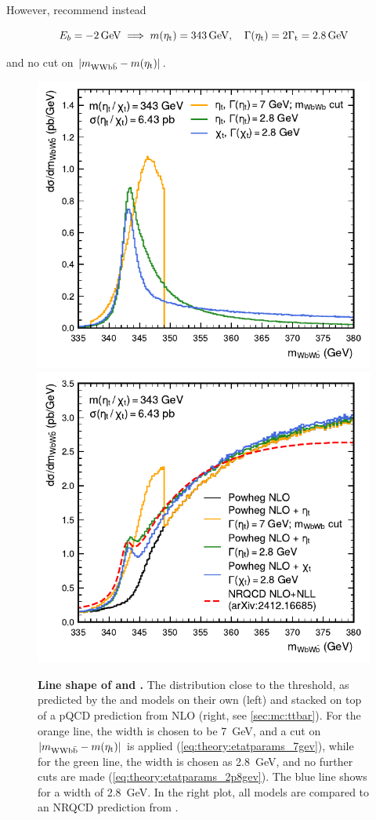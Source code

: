 However,  recommend instead

\begin{equation}
  \label{eq:theory:etatparams_2p8gev}
  E_b = \SI{-2}{\GeV} \implies \metat = \SI{343}{\GeV}, \quad \Gammaetat = 2 \Gammat = \SI{2.8}{\GeV}
\end{equation}

\noindent and no cut on $|m_{\mathrm{WWb\bar{b}}} - m(\mathrm{\eta_t})|$.

\begin{figure}[t]
    \centering
    \includegraphics[width=0.49\linewidth]{figures/ah/etat_chit_small.pdf}
    \hfill
    \includegraphics[width=0.49\linewidth]{figures/ah/powheg_etat_nlo_small.pdf}
    \caption{\textbf{Line shape of \etat and \chit.} The \mWWbb distribution close to the \ttbar threshold, as predicted by the \etat and \chit models on their own (left) and stacked on top of a pQCD \ttbar prediction from \powheg NLO (right, see \cref{sec:mc:ttbar}). For the orange line, the \etat width is chosen to be \SI{7}{\GeV}, and a cut on $|m_{\mathrm{WWb\bar{b}}} - m(\mathrm{\eta_t})|$ is applied (\cref{eq:theory:etatparams_7gev}), while for the green line, the \etat width is chosen as \SI{2.8}{\GeV}, and no further cuts are made (\cref{eq:theory:etatparams_2p8gev}). The blue line shows \chit for a width of \SI{2.8}{\GeV}. In the right plot, all models are compared to an NRQCD prediction from .}
    \label{fig:theory:etat}
\end{figure}

